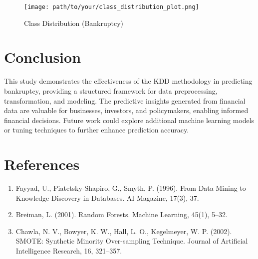 \documentclass{article}
\begin{document}
\begin{figure}[h]
    \centering
    \texttt{[image: path/to/your/class\_distribution\_plot.png]}
    \caption{Class Distribution (Bankruptcy)}
    \label{fig:class_dist}
\end{figure}

\section{Conclusion}

This study demonstrates the effectiveness of the KDD methodology in predicting bankruptcy, providing a structured framework for data preprocessing, transformation, and modeling. The predictive insights generated from financial data are valuable for businesses, investors, and policymakers, enabling informed financial decisions. Future work could explore additional machine learning models or tuning techniques to further enhance prediction accuracy.

\section{References}

\begin{enumerate}
    \item Fayyad, U., Piatetsky-Shapiro, G., Smyth, P. (1996). From Data Mining to Knowledge Discovery in Databases. AI Magazine, 17(3), 37.
    \item Breiman, L. (2001). Random Forests. Machine Learning, 45(1), 5–32.
    \item Chawla, N. V., Bowyer, K. W., Hall, L. O., Kegelmeyer, W. P. (2002). SMOTE: Synthetic Minority Over-sampling Technique. Journal of Artificial Intelligence Research, 16, 321–357.
\end{enumerate}
\end{document}
